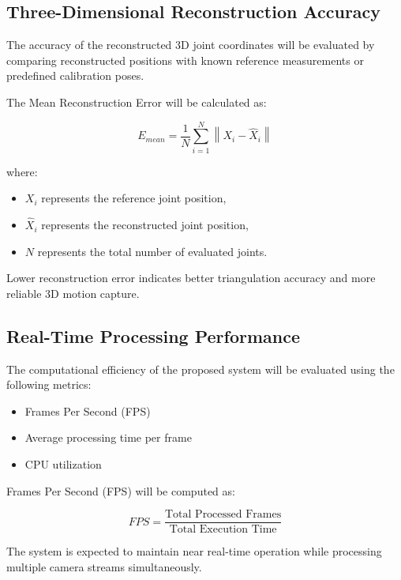 \subsection{Three-Dimensional Reconstruction Accuracy}

The accuracy of the reconstructed 3D joint coordinates will be evaluated by comparing reconstructed positions with known reference measurements or predefined calibration poses.

The Mean Reconstruction Error will be calculated as:

\begin{equation}
E_{mean} = \frac{1}{N}\sum_{i=1}^{N}\left\|X_i-\hat{X}_i\right\|
\end{equation}

where:
\begin{itemize}
    \item $X_i$ represents the reference joint position,
    \item $\hat{X}_i$ represents the reconstructed joint position,
    \item $N$ represents the total number of evaluated joints.
\end{itemize}

Lower reconstruction error indicates better triangulation accuracy and more reliable 3D motion capture.

\subsection{Real-Time Processing Performance}

The computational efficiency of the proposed system will be evaluated using the following metrics:

\begin{itemize}
    \item Frames Per Second (FPS)
    \item Average processing time per frame
    \item CPU utilization
\end{itemize}

Frames Per Second (FPS) will be computed as:

\begin{equation}
FPS = \frac{\text{Total Processed Frames}}{\text{Total Execution Time}}
\end{equation}

The system is expected to maintain near real-time operation while processing multiple camera streams simultaneously.

